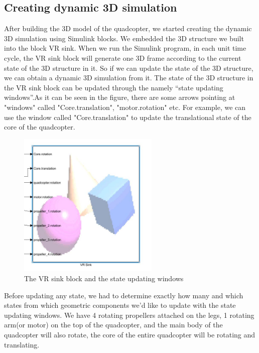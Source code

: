 \subsection{Creating dynamic 3D simulation}
After building the 3D model of the quadcopter, we started creating the dynamic 3D simulation using Simulink blocks. We embedded the 3D structure we built into the block VR sink. 
\newline
\newline
When we run the Simulink program, in each unit time cycle, the VR sink block will generate one 3D frame according to the current state of the 3D structure in it. 
\newline
\newline
So if we can update the state of the 3D structure, we can obtain a dynamic 3D simulation from it. The state of the 3D structure in the VR sink block can be updated through the namely “state updating windows”.As it can be seen in the figure, there are some arrows pointing at "windows" called "Core.translation", "motor.rotation" etc. For example, we can use the window called "Core.translation" to update the translational state of the core of the quadcopter.
\begin{figure}[h]
\centering
\includegraphics[width=0.6\textwidth]{./Lin_img/4.JPG}
\caption{The VR sink block and the state updating windows}
\end{figure}
\newline
Before updating any state, we had to determine exactly how many and which states from which geometric components we’d like to update with the state updating windows. 
\newline
\newline
We have 4 rotating propellers attached on the legs, 1 rotating arm(or motor) on the top of the quadcopter, and the main body of the quadcopter will also rotate, the core of the entire quadcopter will be rotating and translating.
